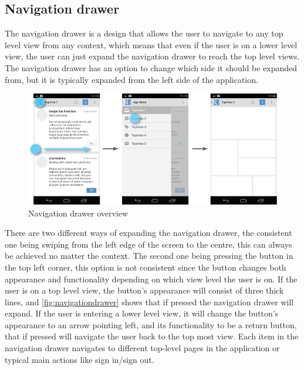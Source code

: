 \subsection{Navigation drawer}
The navigation drawer is a design that allows the user to navigate to any top level view from any context, which means that even if the user is on a lower level view, the user can just expand the navigation drawer to reach the top level views. 
The navigation drawer has an option to change which side it should be expanded from, but it is typically expanded from the left side of the application.
\begin{figure}[H]
\centering
\includegraphics[width=0.9\linewidth]{img/screenshots/navigation_drawer_overview.png}
\caption{Navigation drawer overview \cite{guidelines-navigationdrawer}}
\label{fig:navigationdrawer}
\end{figure}
There are two different ways of expanding the navigation drawer, the consistent one being swiping from the left edge of the screen to the centre, this can always be achieved no matter the context. 
The second one being pressing the button in the top left corner, this option is not consistent since the button changes both appearance and functionality depending on which view level the user is on. 
If the user is on a top level view, the button's appearance will consist of three thick lines, and \autoref{fig:navigationdrawer} shows that if pressed the navigation drawer will expand.
If the user is entering a lower level view, it will change the button's appearance to an arrow pointing left, and its functionality to be a return button, that if pressed will navigate the user back to the top most view. 
Each item in the navigation drawer navigates to different top-level pages in the application or typical main actions like sign in/sign out.

